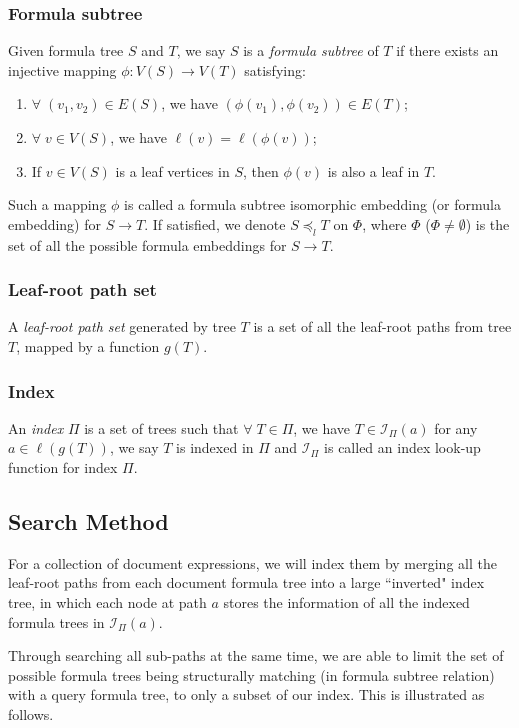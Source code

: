\documentclass{acm_proc_article-sp}
\begin{document}
\subsubsection{Formula subtree}
\label{frmlsubtreeDef}
Given formula tree $S$ and $T$, we say $S$ is a \textit{formula subtree} of $T$ if there exists an injective mapping $\phi: V(S) \rightarrow V(T)$ satisfying:

\begin{enumerate}
\item 
$\forall\; (v_1,v_2) \in E(S)$, we have $(\phi(v_1),\phi(v_2)) \in E(T)$;
\item
$\forall\; v \in V(S)$, we have $\ell(v) = \ell(\phi(v))$;
\item
If $v \in V(S)$ is a leaf vertices in $S$, then $\phi(v)$ is also a leaf in $T$.
\end{enumerate}
Such a mapping $\phi$ is called a formula subtree isomorphic embedding (or formula embedding) for $S \rightarrow T$. 
If satisfied, we denote $S \preceq_l T$ on $\Phi$, where $\Phi$ ($\Phi \neq \emptyset$) is the set of all the possible formula embeddings for $S \rightarrow T$.

\subsubsection{Leaf-root path set}
A \textit{leaf-root path set} generated by tree $T$ is a set of all the leaf-root paths from tree $T$, mapped by a function $g(T)$. 

\subsubsection{Index}
An \textit{index} $\Pi$ is a set of trees such that $\forall\; T \in \Pi$, we have $T \in \mathcal{I}_{\Pi}(a)$ for any $a \in \ell(g(T))$, we say $T$ is indexed in $\Pi$ and $\mathcal{I}_{\Pi}$ is called an index look-up function for index $\Pi$. 

\subsection{Search Method}
\label{se-method}
For a collection of document expressions, we will index them by merging all the leaf-root paths from each document formula tree into a large ``inverted" index tree, 
in which each node at path $a$ stores the information of all the indexed formula trees in $\mathcal{I}_{\Pi}(a)$.

Through searching all sub-paths at the same time, we are able to limit the set of possible formula trees being structurally matching (in formula subtree relation) with a query formula tree, to only a subset of our index. 
This is illustrated as follows.
\end{document}

